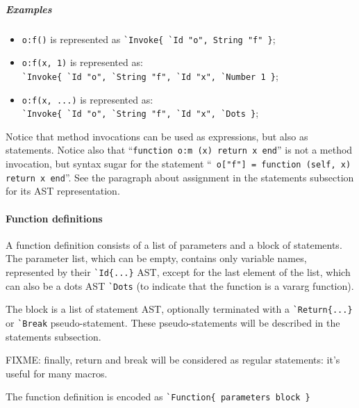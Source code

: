 \subparagraph{Examples}
\begin{itemize}
\item \verb+o:f()+ is represented as \verb+`Invoke{ `Id "o", String "f" }+;
\item \verb+o:f(x, 1)+ is represented as:\\
  \verb+`Invoke{ `Id "o", `String "f", `Id "x", `Number 1 }+;
\item \verb+o:f(x, ...)+ is represented as:\\
  \verb+`Invoke{ `Id "o", `String "f", `Id "x", `Dots }+;
\end{itemize}

Notice that method invocations can be used as expressions, but also as
statements.  Notice also that ``{\tt function o:m (x) return x end}'' is
not a method invocation, but syntax sugar for the statement ``{\tt
o["f"] = function (self, x) return x end}''. See the paragraph about
assignment in the statements subsection for its AST representation.


\paragraph{Function definitions}
A function definition consists of a list of parameters and a block of
statements. The parameter list, which can be empty, contains only
variable names, represented by their \verb+`Id{...}+ AST, except for
the last element of the list, which can also be a dots AST \verb+`Dots+
(to indicate that the function is a vararg function).

The block is a list of statement AST, optionally terminated with a
\verb+`Return{...}+ or \verb+`Break+ pseudo-statement. These
pseudo-statements will be described in the statements subsection.

FIXME: finally, return and break will be considered as regular
statements: it's useful for many macros.

The function definition is encoded as
\verb+`Function{ parameters block }+

